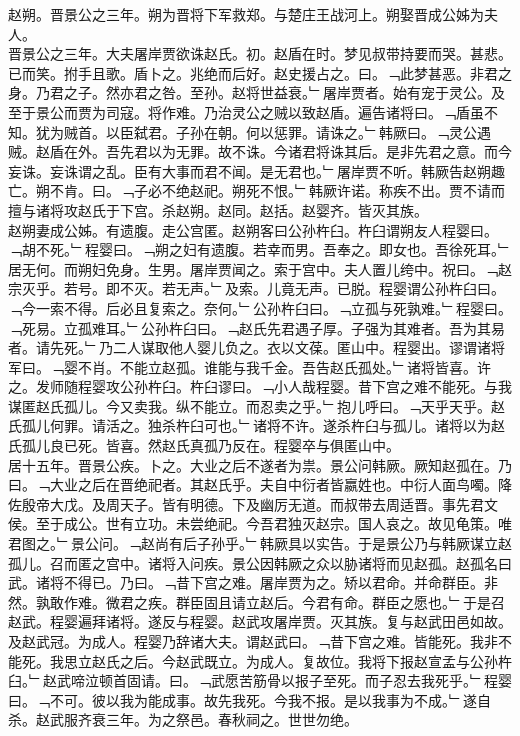 \documentclass{zhvt-classic}
\begin{document}
\hspace*{2em}赵朔。晋景公之三年。朔为晋将下军救郑。与楚庄王战河上。朔娶晋成公姊为夫人。\\
\hspace*{2em}晋景公之三年。大夫屠岸贾欲诛赵氏。初。赵盾在时。梦见叔带持要而哭。甚悲。已而笑。拊手且歌。盾卜之。兆绝而后好。赵史援占之。曰。﹁此梦甚恶。非君之身。乃君之子。然亦君之咎。至孙。赵将世益衰。﹂屠岸贾者。始有宠于灵公。及至于景公而贾为司寇。将作难。乃治灵公之贼以致赵盾。遍告诸将曰。﹁盾虽不知。犹为贼首。以臣弑君。子孙在朝。何以惩罪。请诛之。﹂韩厥曰。﹁灵公遇贼。赵盾在外。吾先君以为无罪。故不诛。今诸君将诛其后。是非先君之意。而今妄诛。妄诛谓之乱。臣有大事而君不闻。是无君也。﹂屠岸贾不听。韩厥告赵朔趣亡。朔不肯。曰。﹁子必不绝赵祀。朔死不恨。﹂韩厥许诺。称疾不出。贾不请而擅与诸将攻赵氏于下宫。杀赵朔。赵同。赵括。赵婴齐。皆灭其族。\\
\hspace*{2em}赵朔妻成公姊。有遗腹。走公宫匿。赵朔客曰公孙杵臼。杵臼谓朔友人程婴曰。﹁胡不死。﹂程婴曰。﹁朔之妇有遗腹。若幸而男。吾奉之。即女也。吾徐死耳。﹂居无何。而朔妇免身。生男。屠岸贾闻之。索于宫中。夫人置儿绔中。祝曰。﹁赵宗灭乎。若号。即不灭。若无声。﹂及索。儿竟无声。已脱。程婴谓公孙杵臼曰。﹁今一索不得。后必且复索之。奈何。﹂公孙杵臼曰。﹁立孤与死孰难。﹂程婴曰。﹁死易。立孤难耳。﹂公孙杵臼曰。﹁赵氏先君遇子厚。子强为其难者。吾为其易者。请先死。﹂乃二人谋取他人婴儿负之。衣以文葆。匿山中。程婴出。谬谓诸将军曰。﹁婴不肖。不能立赵孤。谁能与我千金。吾告赵氏孤处。﹂诸将皆喜。许之。发师随程婴攻公孙杵臼。杵臼谬曰。﹁小人哉程婴。昔下宫之难不能死。与我谋匿赵氏孤儿。今又卖我。纵不能立。而忍卖之乎。﹂抱儿呼曰。﹁天乎天乎。赵氏孤儿何罪。请活之。独杀杵臼可也。﹂诸将不许。遂杀杵臼与孤儿。诸将以为赵氏孤儿良已死。皆喜。然赵氏真孤乃反在。程婴卒与俱匿山中。\\
\hspace*{2em}居十五年。晋景公疾。卜之。大业之后不遂者为祟。景公问韩厥。厥知赵孤在。乃曰。﹁大业之后在晋绝祀者。其赵氏乎。夫自中衍者皆嬴姓也。中衍人面鸟噣。降佐殷帝大戊。及周天子。皆有明德。下及幽厉无道。而叔带去周适晋。事先君文侯。至于成公。世有立功。未尝绝祀。今吾君独灭赵宗。国人哀之。故见龟策。唯君图之。﹂景公问。﹁赵尚有后子孙乎。﹂韩厥具以实告。于是景公乃与韩厥谋立赵孤儿。召而匿之宫中。诸将入问疾。景公因韩厥之众以胁诸将而见赵孤。赵孤名曰武。诸将不得已。乃曰。﹁昔下宫之难。屠岸贾为之。矫以君命。并命群臣。非然。孰敢作难。微君之疾。群臣固且请立赵后。今君有命。群臣之愿也。﹂于是召赵武。程婴遍拜诸将。遂反与程婴。赵武攻屠岸贾。灭其族。复与赵武田邑如故。\\
\hspace*{2em}及赵武冠。为成人。程婴乃辞诸大夫。谓赵武曰。﹁昔下宫之难。皆能死。我非不能死。我思立赵氏之后。今赵武既立。为成人。复故位。我将下报赵宣孟与公孙杵臼。﹂赵武啼泣顿首固请。曰。﹁武愿苦筋骨以报子至死。而子忍去我死乎。﹂程婴曰。﹁不可。彼以我为能成事。故先我死。今我不报。是以我事为不成。﹂遂自杀。赵武服齐衰三年。为之祭邑。春秋祠之。世世勿绝。\\
\end{document}
